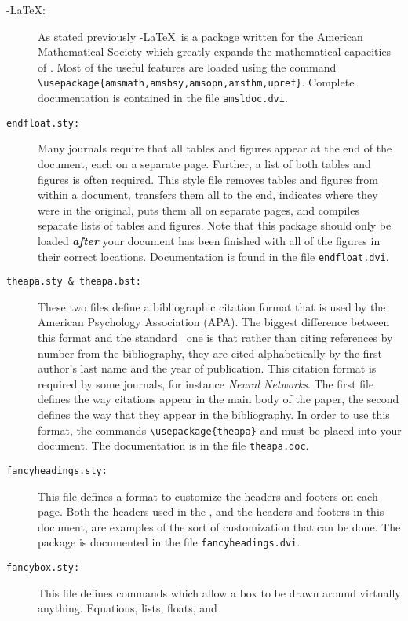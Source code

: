 \documentclass[11pt,titlepage]{article}
\def\AmS{{$\mathcal{A}$\kern-.14em\lower.5ex\hbox{$\mathcal{M}$}%
\kern-.05em$\mathcal{S}$}}
\def\AmSLaTeX{\protect\AmS-\protect\LaTeX}
\begin{document}
\begin{description}
\item[\mdseries\AmSLaTeX:] As stated previously \AmSLaTeX\ is a package
  written for the American Mathematical Society which greatly expands the
  mathematical capacities of \LaTeXe.  Most of the useful features are loaded
  using the command \verb+\usepackage{amsmath,amsbsy,amsopn,amsthm,upref}+.
  Complete documentation is contained in the file \verb+amsldoc.dvi+.
\item[\textmd{\texttt{endfloat.sty:}}] Many journals require that all tables
  and figures appear at the end of the document, each on a separate page.
  Further, a list of both tables and figures is often required.  This style
  file removes tables and figures from within a document, transfers them all
  to the end, indicates where they were in the original, puts them all on
  separate pages, and compiles separate lists of tables and figures.
  Note that this package should only be loaded \textit{\textbf{after}} your
  document has been finished with all of the figures in their correct
  locations.  Documentation is found in the file \verb+endfloat.dvi+.
\item[\textmd{\texttt{theapa.sty \& theapa.bst:}}] These two files define a
  bibliographic citation format that is used by the American Psychology
  Association (APA).  The biggest difference between this format and the
  standard \LaTeXe\ one is that rather than citing references by number from
  the bibliography, they are cited alphabetically by the first author's last
  name and the year of publication.  This citation format is required by some
  journals, for instance \textit{Neural Networks}. The first file defines the
  way citations appear in the main body of the paper, the second defines the
  way that they appear in the bibliography.  In order to use this format, the
  commands \verb+\usepackage{theapa}+ and \verb++
  must be placed into your document.  The documentation is in the file
  \verb+theapa.doc+.
\item[\textmd{\texttt{fancyheadings.sty:}}] This file defines a format to
  customize the headers and footers on each page.  Both the headers used in
  the \cite{Lam94a}, and the headers and footers in this document, are
  examples of the sort of customization that can be done.  The package is
  documented in the file \verb+fancyheadings.dvi+.
\item[\textmd{\texttt{fancybox.sty:}}] This file defines commands which allow
  a box to be drawn around virtually anything.  Equations, lists, floats, and

\end{description}
\end{document}
